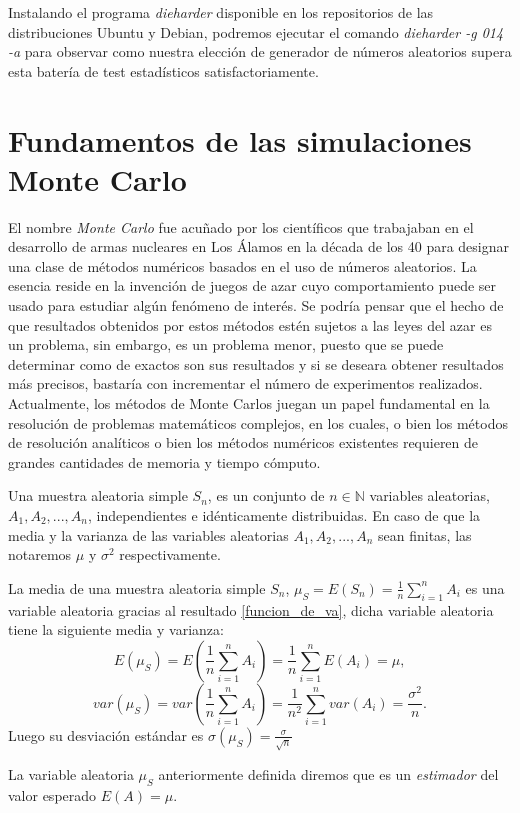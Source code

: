 \documentclass[../proyecto.tex]{memoir}
\begin{document}
Instalando el programa \textit{dieharder} disponible en los repositorios de las distribuciones Ubuntu y Debian, podremos ejecutar el comando \textit{dieharder -g 014 -a} para observar como nuestra elección de generador de números aleatorios supera esta batería de test estadísticos satisfactoriamente.

\section{Fundamentos de las simulaciones Monte Carlo} \label{MonteCarlo}

El nombre \textit{Monte Carlo} fue acuñado por los científicos que trabajaban en el desarrollo de armas nucleares en Los Álamos en la década de los 40 para designar una clase de métodos numéricos basados en el uso de números aleatorios. La esencia reside en la invención de juegos de azar cuyo comportamiento puede ser usado para estudiar algún fenómeno de interés. Se podría pensar que el hecho de que resultados obtenidos por estos métodos estén sujetos a las leyes del azar es un problema, sin embargo, es un problema menor, puesto que se puede determinar como de exactos son sus resultados y si se deseara obtener resultados más precisos, bastaría con incrementar el número de experimentos realizados. Actualmente, los métodos de Monte Carlos juegan un papel fundamental en la resolución de problemas matemáticos complejos, en los cuales, o bien los métodos de resolución analíticos o bien los métodos numéricos existentes requieren de grandes cantidades de memoria y tiempo cómputo.

\begin{defi}
Una muestra aleatoria simple $S_n$, es un conjunto de $n\in\mathds{N}$ variables aleatorias, $A_1,A_2,...,A_n$, independientes e idénticamente distribuidas. En caso de que la media y la varianza de las variables aleatorias $A_1,A_2,...,A_n$ sean finitas, las notaremos $\mu$ y $\sigma^2$ respectivamente.
\end{defi}

La media de una muestra aleatoria simple $S_n$, $\mu_S = E(S_n) = \frac{1}{n}\sum_{i=1}^n A_i$ es una variable aleatoria gracias al resultado \ref{funcion_de_va}, dicha variable aleatoria tiene la siguiente media y varianza:$$
E(\mu_S) = E(\frac{1}{n}\sum_{i=1}^n A_i) = \frac{1}{n}\sum_{i=1}^n E(A_i) = \mu,
$$
$$
var(\mu_S) = var(\frac{1}{n}\sum_{i=1}^n A_i) = \frac{1}{n^2} \sum_{i=1}^n var(A_i) = \frac{\sigma^2}{n}.
$$
Luego su desviación estándar es $\sigma(\mu_S) = \frac{\sigma}{\sqrt{n}}$ 
\begin{defi}
La variable aleatoria $\mu_S$ anteriormente definida diremos que es un \textit{estimador} del valor esperado $E(A)=\mu$.
\end{defi}
\end{document}

